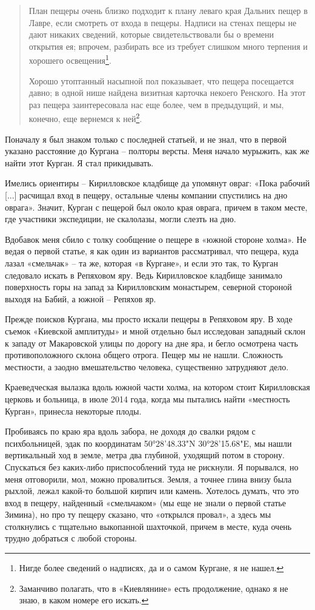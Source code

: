 \begin{quotation}
План пещеры очень близко подходит к плану леваго края Дальних пещер в Лавре, если смотреть от входа в пещеры. Надписи на стенах пещеры не дают никаких сведений, которые свидетельствовали бы о времени открытия ея; впрочем, разбирать все из требует слишком много терпения и хорошего освещения\footnote{Нигде более сведений о надписях, да и о самом Кургане, я не нашел.}.

Хорошо утоптанный насыпной пол показывает, что пещера посещается давно; в одной нише найдена визитная карточка некоего Ренского. На этот раз пещера заинтересовала нас еще более, чем в предыдущий, и мы, конечно, еще вернемся к ней\footnote{Заманчиво полагать, что в «Киевлянине» есть продолжение, однако я не знаю, в каком номере его искать.}. 
\end{quotation}

Поначалу я был знаком только с последней статьей, и не знал, что в первой указано расстояние до Кургана – полторы версты. Меня начало мурыжить, как же найти этот Курган. Я стал прикидывать.

Имелись ориентиры – Кирилловское кладбище да упомянут овраг: «Пока рабочий [...] расчищал вход в пещеру, остальные члены компании спустились на дно оврага». Значит, Курган с пещерой был около края оврага, причем в таком месте, где участники экспедиции, не скалолазы, могли слезть на дно.

Вдобавок меня сбило с толку сообщение о пещере в «южной стороне холма». Не ведая о первой статье, я как один из вариантов рассматривал, что пещера, куда лазал «смельчак» – та же, которая «в Кургане», и если это так, то Курган следовало искать в Репяховом яру. Ведь Кирилловское кладбище занимало поверхность горы на запад за Кирилловским монастырем, северной стороной выходя на Бабий, а южной – Репяхов яр. 

Прежде поисков Кургана, мы просто искали пещеры в Репяховом яру. В ходе съемок «Киевской амплитуды» и мной отдельно был исследован западный склон к западу от Макаровской улицы по дорогу на дне яра, и бегло осмотрена часть противоположного склона общего отрога. Пещер мы не нашли. Сложность местности, а заодно вмешательство  человека, существенно затрудняют дело.

Краеведческая вылазка вдоль южной части холма, на котором стоит Кирилловская церковь и больница, в июле 2014 года, когда мы пытались найти «местность Курган», принесла некоторые плоды.

Пробиваясь по краю яра вдоль забора, не доходя до свалки рядом с психбольницей, эдак по координатам 50°28'48.33"N 30°28'15.68"E, мы нашли вертикальный ход в земле, метра два глубиной, уходящий потом в сторону. Спускаться без каких-либо приспособлений туда не рискнули. Я порывался, но меня отговорили, мол, можно провалиться. Земля, а точнее глина внизу была рыхлой, лежал какой-то большой кирпич или камень. Хотелось думать, что это вход в пещеру, найденный «смельчаком» (мы еще не знали о первой статье Зимина), но про ту пещеру сказано, что «открылся провал», а здесь мы столкнулись с тщательно выкопанной шахточкой, причем в месте, куда очень трудно добраться с любой стороны.

